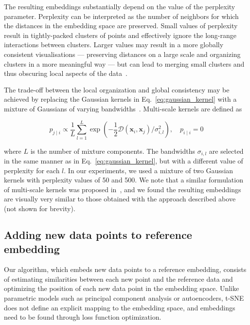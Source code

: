 \documentclass[runningheads]{llncs}
\begin{document}
The resulting embeddings substantially depend on the value of the perplexity
parameter. Perplexity can be interpreted as the number of
neighbors for which the distances in the embedding space are preserved. Small
values of perplexity result in tightly-packed clusters of points and effectively
ignore the long-range interactions between clusters. Larger values may result
in a more globally consistent visualisations --- preserving distances on a large
scale and organizing clusters in a more meaningful way --- but can lead to merging 
small clusters and thus obscuring local aspects of the data~\cite{art_of_using_tsne}.

The trade-off between the local organization and global consistency may be
achieved by replacing the Gaussian kernels in Eq.~\ref{eq:gaussian_kernel} with
a mixture of Gaussians of varying bandwidths~\cite{multiscale_tsne}.
Multi-scale kernels are defined as

\begin{equation}
p_{j \mid i} \propto \frac{1}{L} \sum_{l=1}^{L} \exp \left ( - \frac{1}{2} \mathcal{D}(\mathbf{x}_i, \mathbf{x}_j ) / \sigma_{i,l}^2 \right ), \quad p_{i \mid i} = 0
\label{eq:multiscale}
\end{equation}

\noindent where $L$ is the number of mixture components. The bandwidths
$\sigma_{i,l}$ are selected in the same manner as in
Eq.~\ref{eq:gaussian_kernel}, but with a different value of perplexity for each
$l$. In our experiments, we used a mixture of two Gaussian kernels with
perplexity values of 50 and 500. We note that a similar formulation of
multi-scale kernels was proposed in~\cite{art_of_using_tsne}, and we found the
resulting embeddings are visually very similar to those obtained with the
approach described above (not shown for brevity).


\subsection{Adding new data points to reference embedding\label{sec:transfer}}

Our algorithm, which embeds new data points to a reference embedding, consists of
estimating similarities between each new point and the reference data and optimizing
the position of each new data point in the embedding space. Unlike parametric models
such as principal component analysis or autoencoders, t-SNE does not define an
explicit mapping to the embedding space, and embeddings need to be found through
loss function optimization.
\end{document}
